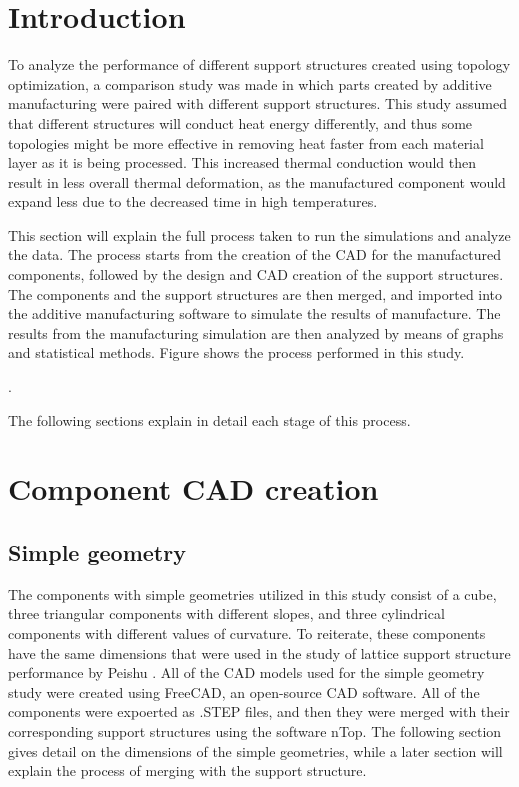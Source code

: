 \documentclass[../main.tex]{subfiles}
\begin{document}
	
\section{Introduction}

To analyze the performance of different support structures created using topology optimization, a comparison study was made in which parts created by additive manufacturing were paired with different support structures. This study assumed that different structures will conduct heat energy differently, and thus some topologies might be more effective in removing heat faster from each material layer as it is being processed. This increased thermal conduction would then result in less overall thermal deformation, as the manufactured component would expand less due to the decreased time in high temperatures. 

This section will explain the full process taken to run the simulations and analyze the data. The process starts from the creation of the CAD for the manufactured components, followed by the design and CAD creation of the support structures. The components and the support structures are then merged, and imported into the additive manufacturing software to simulate the results of manufacture. The results from the manufacturing simulation are then analyzed by means of graphs and statistical methods. Figure  shows the process performed in this study.

.

The following sections explain in detail each stage of this process.

\section{Component CAD creation}

\subsection{Simple geometry}

The components with simple geometries utilized in this study consist of a cube, three triangular
components with different slopes, and three cylindrical components with different values of
curvature. To reiterate, these components have the same dimensions that were used in the study of lattice
support structure performance by Peishu . All of the CAD models
used for the simple geometry study were created using FreeCAD, an open-source CAD software. All of the components were expoerted as .STEP files, and then they were merged with their corresponding support structures using the software nTop. The following section gives detail on the dimensions of the simple geometries, while a later section will explain the process of merging with the support structure.
\end{document}
